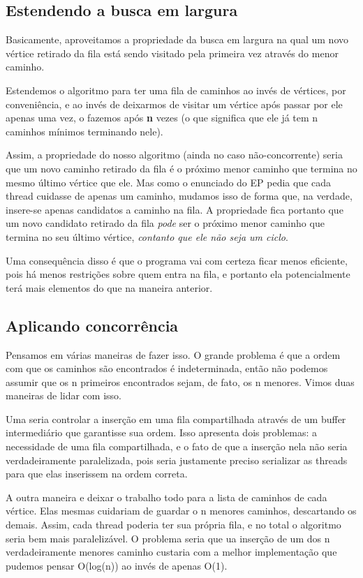 \documentclass[a4paper,11pt]{article}
\begin{document}
  \subsection{Estendendo a busca em largura}
    Basicamente, aproveitamos a propriedade da busca em largura na qual um novo
    vértice retirado da fila está sendo visitado pela primeira vez através do
    menor caminho.

    Estendemos o algoritmo para ter uma fila de caminhos ao invés de vértices,
    por conveniência, e ao invés de deixarmos de visitar um vértice após passar
    por ele apenas uma vez, o fazemos após \textbf{n} vezes (o que significa
    que ele já tem n caminhos mínimos terminando nele).

    Assim, a propriedade do nosso algoritmo (ainda no caso não-concorrente)
    seria que um novo caminho retirado da fila é o próximo menor caminho que
    termina no mesmo último vértice que ele. Mas como o enunciado do EP pedia
    que cada thread cuidasse de apenas um caminho, mudamos isso de forma que, na
    verdade, insere-se apenas candidatos a caminho na fila. A propriedade fica
    portanto que um novo candidato retirado da fila \textit{pode} ser o próximo
    menor caminho que termina no seu último vértice, \textit{contanto que ele
    não seja um ciclo}.

    Uma consequência disso é que o programa vai com certeza ficar menos
    eficiente, pois há menos restrições sobre quem entra na fila, e portanto ela
    potencialmente terá mais elementos do que na maneira anterior.

  \subsection{Aplicando concorrência}
    Pensamos em várias maneiras de fazer isso. O grande problema é que a ordem
    com que os caminhos são encontrados é indeterminada, então não podemos
    assumir que os n primeiros encontrados sejam, de fato, os n menores. Vimos
    duas maneiras de lidar com isso.

    Uma seria controlar a inserção em uma fila compartilhada através de um
    buffer intermediário que garantisse sua ordem. Isso apresenta dois
    problemas: a necessidade de uma fila compartilhada, e o fato de que a
    inserção nela não seria verdadeiramente paralelizada, pois seria justamente
    preciso serializar as threads para que elas inserissem na ordem correta.

    A outra maneira e deixar o trabalho todo para a lista de caminhos de cada
    vértice. Elas mesmas cuidariam de guardar o n menores caminhos, descartando
    os demais. Assim, cada thread poderia ter sua própria fila, e no total o
    algoritmo seria bem mais paralelizável. O problema seria que ua inserção de
    um dos n verdadeiramente menores caminho custaria com a melhor implementação
    que pudemos pensar O(log(n)) ao invés de apenas O(1).
\end{document}
